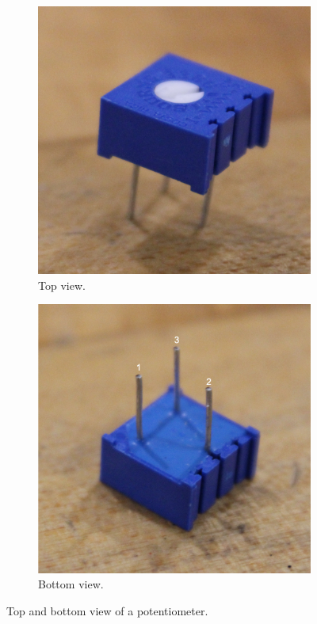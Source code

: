 \documentclass[12pt]{article}
\begin{document}
\begin{figure}[H]
\begin{subfigure}{.5\textwidth}
    \centering
    \includegraphics[width=0.8\linewidth]{photos/prelim/pot.png}
    \caption{Top view.}
\end{subfigure}%
\begin{subfigure}{.5\textwidth}
  \centering
  \includegraphics[width=0.79\linewidth]{photos/prelim/potlabeled.png}
  \caption{Bottom view.}
\end{subfigure}
\caption{Top and bottom view of a potentiometer.}
\end{figure}
\end{document}
